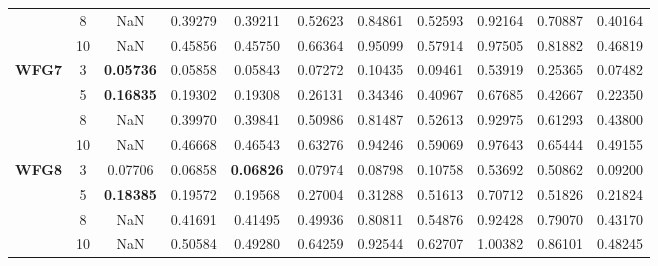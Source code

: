 \documentclass[conference]{IEEEtran}
\begin{document}
\begin{table*}[!htb]
\begin{tabular}{|c|c|c|c|c|c|c|c|c|c|c|}
		& 8          & NaN              & 0.39279           & 0.39211               & 0.52623          & 0.84861             & 0.52593             & 0.92164            & 0.70887              & 0.40164          \\ \cline{2-11} 
		& 10         & NaN              & 0.45856           & 0.45750               & 0.66364          & 0.95099             & 0.57914             & 0.97505            & 0.81882              & 0.46819          \\ \hline
		\multirow{4}{*}{\textbf{WFG7}}  & 3          & \textbf{0.05736} & 0.05858           & 0.05843               & 0.07272          & 0.10435             & 0.09461             & 0.53919            & 0.25365              & 0.07482          \\ \cline{2-11} 
		& 5          & \textbf{0.16835} & 0.19302           & 0.19308               & 0.26131          & 0.34346             & 0.40967             & 0.67685            & 0.42667              & 0.22350          \\ \cline{2-11} 
		& 8          & NaN              & 0.39970           & 0.39841               & 0.50986          & 0.81487             & 0.52613             & 0.92975            & 0.61293              & 0.43800          \\ \cline{2-11} 
		& 10         & NaN              & 0.46668           & 0.46543               & 0.63276          & 0.94246             & 0.59069             & 0.97643            & 0.65444              & 0.49155          \\ \hline
		\multirow{4}{*}{\textbf{WFG8}}  & 3          & 0.07706          & 0.06858           & \textbf{0.06826}      & 0.07974          & 0.08798             & 0.10758             & 0.53692            & 0.50862              & 0.09200          \\ \cline{2-11} 
		& 5          & \textbf{0.18385} & 0.19572           & 0.19568               & 0.27004          & 0.31288             & 0.51613             & 0.70712            & 0.51826              & 0.21824          \\ \cline{2-11} 
		& 8          & NaN              & 0.41691           & 0.41495               & 0.49936          & 0.80811             & 0.54876             & 0.92428            & 0.79070              & 0.43170          \\ \cline{2-11} 
		& 10         & NaN              & 0.50584           & 0.49280               & 0.64259          & 0.92544             & 0.62707             & 1.00382            & 0.86101              & 0.48245          \\ \hline

\end{tabular}
\end{table*}
\end{document}
